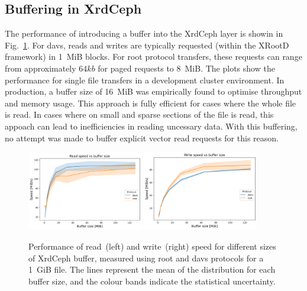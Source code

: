 \documentclass{webofc}
\begin{document}
\subsection{Buffering in XrdCeph\label{buffer}}
The performance of introducing a buffer into the XrdCeph layer is showin in Fig.~\ref{fig:buffering}.
For davs, reads and writes are typically requested (within the XRootD framework) in 1~MiB blocks. For root protocol transfers, these requests can range from approximately $64kb$ for paged requests to 8~MiB. The plots show the performance for single file transfers in a development cluster environment. In production, a buffer size of 16~MiB was empirically found to optimise throughput and memory usage. This approach is fully efficient for cases where the whole file is read. In cases where on small and sparse sections of the file is read, this appoach can lead to inefficiencies in reading uncessary data. 
With this buffering, no attempt was made to buffer explicit vector read requests for this reason. 
%
\begin{figure}[h]
     \centering
     \includegraphics[width=0.45\textwidth,clip]{figures/fig_read_speed.png}\hfil
     \includegraphics[width=0.45\textwidth,clip]{figures/fig_write_speed.png}
     \caption{Performance of read~(left) and write~(right) speed for different sizes of XrdCeph buffer, measured using root and davs protocols for a 1~GiB file. The lines represent the mean of the distribution for each buffer size, and the colour bands indicate the statistical uncertainty.}
     \label{fig:buffering}       %
\end{figure}
\end{document}
